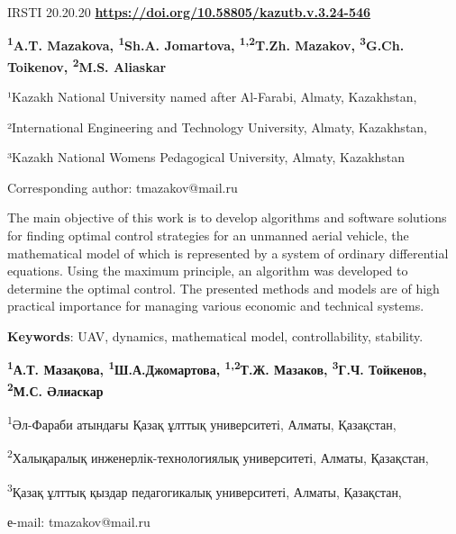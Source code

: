 \newpage
IRSTI 20.20.20
\hfill {\bfseries \href{https://doi.org/10.58805/kazutb.v.3.24-546}{https://doi.org/10.58805/kazutb.v.3.24-546}}


\begin{center}

{\bfseries \textsuperscript{1}A.T. Mazakova, \textsuperscript{1}Sh.A.
Jomartova, \textsuperscript{1,2}T.Zh. Mazakov\envelope, \textsuperscript{3}G.Ch. Toikenov, \textsuperscript{2}M.S. Aliaskar}

¹Kazakh National University named after Al-Farabi, Almaty, Kazakhstan,

²International Engineering and Technology University, Almaty,
Kazakhstan,

³Kazakh National Women\textquotesingle s Pedagogical University, Almaty,
Kazakhstan
\end{center}
\envelope Corresponding author: tmazakov@mail.ru \vspace{0.5cm}

The main objective of this work is to develop algorithms and software
solutions for finding optimal control strategies for an unmanned aerial
vehicle, the mathematical model of which is represented by a system of
ordinary differential equations. Using the maximum principle, an
algorithm was developed to determine the optimal control. The presented
methods and models are of high practical importance for managing various
economic and technical systems.

{\bfseries Keywords}: UAV, dynamics, mathematical model, controllability,
stability.


\begin{center}
{\bfseries \textsuperscript{1}А.Т. Мазақова,
\textsuperscript{1}Ш.А.Джомартова, \textsuperscript{1,2}Т.Ж.
Мазаков\envelope, \textsuperscript{3}Г.Ч. Тойкенов, \textsuperscript{2}М.С. Әлиаскар}

\textsuperscript{1}Әл-Фараби атындағы Қазақ ұлттық университеті, Алматы,
Қазақстан,

\textsuperscript{2}Халықаралық инженерлік-технологиялық университеті,
Алматы, Қазақстан,

\textsuperscript{3}Қазақ ұлттық қыздар педагогикалық университеті,
Алматы, Қазақстан,

е-mail: tmazakov@mail.ru
\end{center}


